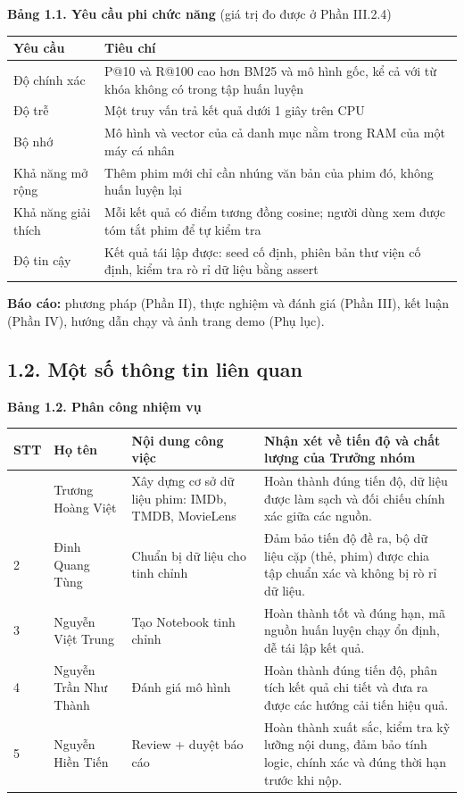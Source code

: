 \documentclass[12pt,a4paper]{article}
\newcommand{\np}{\Needspace{8\baselineskip}}
\let\oldsubsection\subsection
\renewcommand{\subsection}{\Needspace{12\baselineskip}\oldsubsection}
\begin{document}
\np\textbf{Bảng 1.1. Yêu cầu phi chức năng} (giá trị đo được ở Phần III.2.4)

{\def\LTcaptype{}\small
\begin{longtable}[]{@{}*{2}{P{(\linewidth - 2\tabcolsep) * }}@{}}
\toprule
\textbf{Yêu cầu} & \textbf{Tiêu chí} \\
\midrule
\endhead
\bottomrule
\endlastfoot
Độ chính xác & P@10 và R@100 cao hơn BM25 và mô hình gốc, kể cả với từ khóa không có trong tập huấn luyện \\
Độ trễ & Một truy vấn trả kết quả dưới 1 giây trên CPU \\
Bộ nhớ & Mô hình và vector của cả danh mục nằm trong RAM của một máy cá nhân \\
Khả năng mở rộng & Thêm phim mới chỉ cần nhúng văn bản của phim đó, không huấn luyện lại \\
Khả năng giải thích & Mỗi kết quả có điểm tương đồng cosine; người dùng xem được tóm tắt phim để tự kiểm tra \\
Độ tin cậy & Kết quả tái lập được: seed cố định, phiên bản thư viện cố định, kiểm tra rò rỉ dữ liệu bằng assert \\
\end{longtable}
}

\textbf{Báo cáo:} phương pháp (Phần II), thực nghiệm và đánh giá (Phần III), kết luận (Phần IV), hướng dẫn chạy và ảnh trang demo (Phụ lục).

\subsection{1.2. Một số thông tin liên quan}

\np\textbf{Bảng 1.2. Phân công nhiệm vụ}

{\def\LTcaptype{}\small
\begin{longtable}[]{@{}*{4}{P{(\linewidth - 6\tabcolsep) * }}@{}}
\toprule
\textbf{STT} & \textbf{Họ tên} & \textbf{Nội dung công việc} & \textbf{Nhận xét về tiến độ và chất lượng của Trưởng nhóm} \\
\midrule
\endhead
\bottomrule
{} & Trương Hoàng Việt & Xây dựng cơ sở dữ liệu phim: IMDb, TMDB, MovieLens & Hoàn thành đúng tiến độ, dữ liệu được làm sạch và đối chiếu chính xác giữa các nguồn. \\
2 & Đinh Quang Tùng & Chuẩn bị dữ liệu cho tinh chỉnh & Đảm bảo tiến độ đề ra, bộ dữ liệu cặp (thẻ, phim) được chia tập chuẩn xác và không bị rò rỉ dữ liệu. \\
3 & Nguyễn Việt Trung & Tạo Notebook tinh chỉnh & Hoàn thành tốt và đúng hạn, mã nguồn huấn luyện chạy ổn định, dễ tái lập kết quả. \\
4 & Nguyễn Trần Như Thành & Đánh giá mô hình & Hoàn thành đúng tiến độ, phân tích kết quả chi tiết và đưa ra được các hướng cải tiến hiệu quả. \\
5 & Nguyễn Hiền Tiến & Review + duyệt báo cáo & Hoàn thành xuất sắc, kiểm tra kỹ lưỡng nội dung, đảm bảo tính logic, chính xác và đúng thời hạn trước khi nộp. \\
\end{longtable}
}
\end{document}
